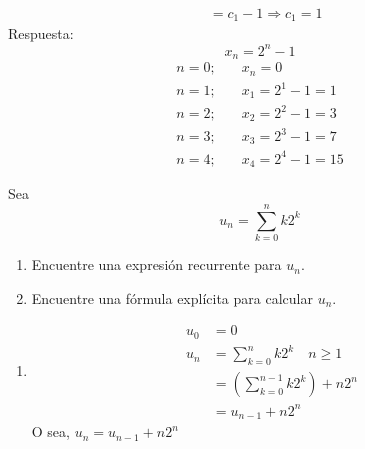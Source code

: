 \begin{ejercicio}
\begin{align*}
          &= c_1 - 1 \Longrightarrow c_1 = 1
    \end{align*}
    Respuesta:
    \begin{equation*}
        x_n = 2^n -1
    \end{equation*}
    \begin{align*}
        n = 0;& \quad x_n = 0 \\
        n = 1;& \quad x_1 = 2^1 - 1 = 1 \\
        n = 2;& \quad x_2 = 2^2 - 1 = 3 \\
        n = 3;& \quad x_3 = 2^3 - 1 = 7 \\
        n = 4;& \quad x_4 = 2^4 - 1 = 15
    \end{align*}
\end{ejercicio}

\begin{ejercicio}
    Sea 
    \begin{equation*}
        u_n = \sum_{k = 0}^n k 2^k
    \end{equation*}

    \begin{enumerate}
        \item Encuentre una expresión recurrente para $u_n$.
        \item Encuentre una fórmula explícita para calcular $u_n$.
    \end{enumerate}

    \begin{enumerate} 
        \item 
        \begin{align*}
            u_0 &= 0 \\
            u_n &= \sum_{k=0}^n k 2^k \quad n \geq 1\\
                &= \left(\sum_{k=0}^{n-1} k2^k\right) + n2^n \\
                &= u_{n-1} + n2^n
        \end{align*}
        O sea, $u_n = u_{n-1} + n 2^n$


\end{enumerate}
\end{ejercicio}
